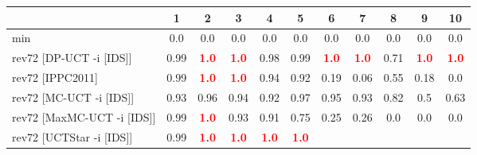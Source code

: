 \documentclass{article}
\begin{document}
\begin{tabular}{|l|r@{$\pm$}rr@{$\pm$}rr@{$\pm$}rr@{$\pm$}rr@{$\pm$}rr@{$\pm$}rr@{$\pm$}rr@{$\pm$}rr@{$\pm$}rr@{$\pm$}r|}
\hline

& \multicolumn{2}{c}{1}
& \multicolumn{2}{c}{2}
& \multicolumn{2}{c}{3}
& \multicolumn{2}{c}{4}
& \multicolumn{2}{c}{5}
& \multicolumn{2}{c}{6}
& \multicolumn{2}{c}{7}
& \multicolumn{2}{c}{8}
& \multicolumn{2}{c}{9}
& \multicolumn{2}{c|}{10}
\\
\hline
\hline
min
& \multicolumn{2}{c}{0.0}
& \multicolumn{2}{c}{0.0}
& \multicolumn{2}{c}{0.0}
& \multicolumn{2}{c}{0.0}
& \multicolumn{2}{c}{0.0}
& \multicolumn{2}{c}{0.0}
& \multicolumn{2}{c}{0.0}
& \multicolumn{2}{c}{0.0}
& \multicolumn{2}{c}{0.0}
& \multicolumn{2}{c|}{0.0}
\\
rev72 [DP-UCT -i [IDS]]
& \multicolumn{2}{c}{0.99}
& \multicolumn{2}{c}{\textbf{\textcolor{red}{1.0}}}
& \multicolumn{2}{c}{\textbf{\textcolor{red}{1.0}}}
& \multicolumn{2}{c}{0.98}
& \multicolumn{2}{c}{0.99}
& \multicolumn{2}{c}{\textbf{\textcolor{red}{1.0}}}
& \multicolumn{2}{c}{\textbf{\textcolor{red}{1.0}}}
& \multicolumn{2}{c}{0.71}
& \multicolumn{2}{c}{\textbf{\textcolor{red}{1.0}}}
& \multicolumn{2}{c|}{\textbf{\textcolor{red}{1.0}}}
\\
rev72 [IPPC2011]
& \multicolumn{2}{c}{0.99}
& \multicolumn{2}{c}{\textbf{\textcolor{red}{1.0}}}
& \multicolumn{2}{c}{\textbf{\textcolor{red}{1.0}}}
& \multicolumn{2}{c}{0.94}
& \multicolumn{2}{c}{0.92}
& \multicolumn{2}{c}{0.19}
& \multicolumn{2}{c}{0.06}
& \multicolumn{2}{c}{0.55}
& \multicolumn{2}{c}{0.18}
& \multicolumn{2}{c|}{0.0}
\\
rev72 [MC-UCT -i [IDS]]
& \multicolumn{2}{c}{0.93}
& \multicolumn{2}{c}{0.96}
& \multicolumn{2}{c}{0.94}
& \multicolumn{2}{c}{0.92}
& \multicolumn{2}{c}{0.97}
& \multicolumn{2}{c}{0.95}
& \multicolumn{2}{c}{0.93}
& \multicolumn{2}{c}{0.82}
& \multicolumn{2}{c}{0.5}
& \multicolumn{2}{c|}{0.63}
\\
rev72 [MaxMC-UCT -i [IDS]]
& \multicolumn{2}{c}{0.99}
& \multicolumn{2}{c}{\textbf{\textcolor{red}{1.0}}}
& \multicolumn{2}{c}{0.93}
& \multicolumn{2}{c}{0.91}
& \multicolumn{2}{c}{0.75}
& \multicolumn{2}{c}{0.25}
& \multicolumn{2}{c}{0.26}
& \multicolumn{2}{c}{0.0}
& \multicolumn{2}{c}{0.0}
& \multicolumn{2}{c|}{0.0}
\\
rev72 [UCTStar -i [IDS]]
& \multicolumn{2}{c}{0.99}
& \multicolumn{2}{c}{\textbf{\textcolor{red}{1.0}}}
& \multicolumn{2}{c}{\textbf{\textcolor{red}{1.0}}}
& \multicolumn{2}{c}{\textbf{\textcolor{red}{1.0}}}
& \multicolumn{2}{c}{\textbf{\textcolor{red}{1.0}}}

\end{tabular}
\end{document}
